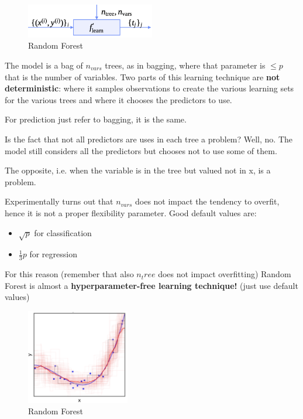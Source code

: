 \begin{figure}[H]
    \centering 
    \includegraphics[width=0.5\textwidth]{assets/fig22.png}
    \caption{Random Forest}
\end{figure}

The model is a bag of $n_{vars}$ trees, as in bagging, where that parameter is $\leq p$ that is the number of variables. Two parts of this learning technique are \textbf{not deterministic}: where it samples observations to create the various learning sets for the various trees and where it chooses the predictors to use.

For prediction just refer to bagging, it is the same.

Is the fact that not all predictors are uses in each tree a problem? Well, no. The model still considers all the predictors but chooses not to use some of them.

\begin{warningblock}
    The opposite, i.e. when the variable is in the tree but valued not in x, is a problem.
\end{warningblock}

Experimentally turns out that $n_{vars}$ does not impact the tendency to overfit, hence it is not a proper flexibility parameter. 
Good default values are:
\begin{itemize}
    \item $\sqrt{p}$ for classification 
    \item $\frac{1}{3}p$ for regression 
\end{itemize}

For this reason (remember that also $n_tree$ does not impact overfitting) Random Forest is almost a \textbf{hyperparameter-free learning technique!} (\to just use default values)

\begin{figure}[H]
    \centering 
    \includegraphics[width=0.4\textwidth]{assets/fig23.png}
    \caption{Random Forest}
\end{figure}


